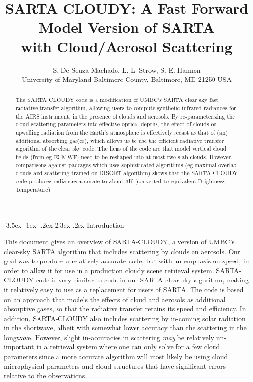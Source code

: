 \documentclass[11pt]{article}
\title{\textsf{SARTA CLOUDY}: A Fast Forward Model Version of
  \textsf{SARTA}\\ with Cloud/Aerosol Scattering}
\author{S. De Souza-Machado, L. L. Strow, S. E. Hannon \\
      University of Maryland Baltimore County, Baltimore, MD 21250 USA}
\makeatletter
\newcommand{\sa}{\textsf{SARTA}\xspace}
\newcommand{\sasc}{\textsf{SARTA-CLOUDY}\xspace}
\renewcommand{\section}{\@startsection {section}{1}{\z@}%
                                   {-3.5ex \@plus -1ex \@minus -.2ex}%
                                   {2.3ex \@plus.2ex}%
                                   {\reset@font\large\bfseries}}
\makeatother
\begin{document}
    \maketitle

    \begin{abstract}

      The \textsf{SARTA CLOUDY} code is a modification of UMBC's \sa
      clear-sky fast radiative transfer algorithm, allowing users to
      compute synthetic infrared radiances for the AIRS instrument, in
      the presence of clouds and aerosols. By re-parameterizing the
      cloud scattering parameters into effective optical depths, the
      effect of clouds on upwelling radiation from the Earth's
      atmosphere is effectively recast as that of (an) additional
      absorbing gas(es), which allows us to use the efficient
      radiative transfer algorithm of the clear sky code. The liens of
      the code are that model vertical cloud fields (from eg ECMWF)
      need to be reshaped into at most two slab clouds. However,
      comparisons against packages which uses sophisticated algorithms
      (eg maximal overlap clouds and scattering trained on DISORT
      algorithm) shows that the \textsf{SARTA CLOUDY} code produces
      radiances accurate to about 3K (converted to equivalent
      Brightness Temperature)

    \end{abstract}

    \section{Introduction}

    This document gives an overview of \sasc, a version of UMBC's
    clear-sky \sa algorithm that includes scattering by clouds an
    aerosols.  Our goal was to produce a relatively accurate code, but
    with an emphasis on speed, in order to allow it for use in a
    production cloudy scene retrieval system.  \sasc code is very
    similar to code in our \sa clear-sky algorithm, making it
    relatively easy to use as a replacement for users of \sa.  The
    code is based on an approach that models the effects of cloud and
    aerosols as additional absorptive gases, so that the radiative
    transfer retains its speed and efficiency.  In addition, \sasc
    also includes scattering by in-coming solar radiation in the
    shortwave, albeit with somewhat lower accuracy than the scattering
    in the longwave.  However, slight in-accuracies in scattering
    \emph{may} be relatively un-important in a retrieval system where
    one can only solve for a few cloud parameters since a more
    accurate algorithm will most likely be using cloud microphysical
    parameters and cloud structures that have significant errors
    relative to the observations.
\end{document}
